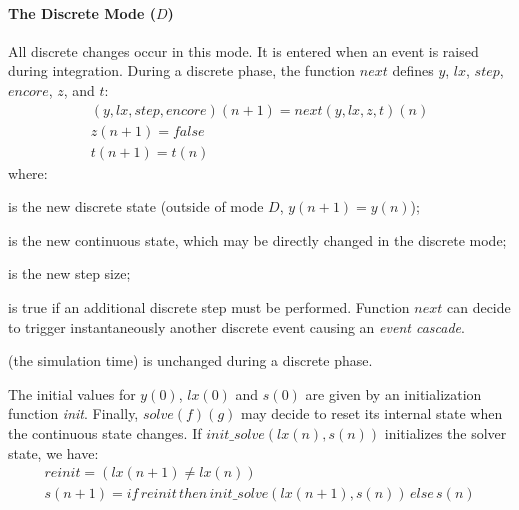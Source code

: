 \documentclass[11pt,titlepage,twoside]{report}
\newcommand{\lx}{\ensuremath{\mathit{lx}}}
\newcommand{\step}{\ensuremath{\mathit{step}}}
\newcommand{\encore}{\ensuremath{\mathit{encore}}}
\newcommand{\Solve}[2]{\mathit{solve}({#1})({#2})}
\newcommand{\Ifthenelse}[3]
   {\mathit{if}\,{#1}\,\mathit{then}\,{#2}\,\mathit{else}\,{#3}}
\newcommand{\bR}{\mathbb{R}}
\begin{document}
\paragraph{The Discrete Mode ($D$)}
All discrete changes occur in this mode.
It is entered when an
event is raised during integration. During a discrete phase,
the function $\mathit{next}$ defines $y$, $\lx$, $\step$, $\encore$, $z$, and $t$:
\[
\begin{array}{c}
(y, \lx, step, encore%
)(n+1) = next (y, \lx, z, t)(n) \\[1.5ex]
z(n+1) = false \\[1.5ex]
t(n+1) = t(n)
\end{array}
\]
where:
\begin{description}[leftmargin=6em,style=multiline]


\item[$y(n+1)$] is the new discrete state (outside of mode $D$, $y(n+1) = 
y(n)$);

\item[$\lx(n+1)$] is the new continuous state, which may be directly changed 
in the discrete mode; %

\item[$\step(n+1)$] is the new step size;

\item[$\encore(n+1)$] is true if an additional discrete step must be
  performed. Function $\mathit{next}$ can decide to trigger instantaneously
  another discrete event causing an \emph{event cascade}.

\item[$t(n)$] (the simulation time) is unchanged during a discrete phase.
\end{description}
%
The initial values for $y(0)$, $\lx(0)$ and $s(0)$ are given by an
initialization function \textit{init}. Finally, $\Solve{f}{g}$ may
decide to reset its internal state when the continuous state
changes. If $init\_solve(\lx(n), s(n))$ initializes the solver state,
we have:
\[
\begin{array}{c}
reinit = (\lx(n+1) \not= \lx(n)) \\[1.5ex]
s(n+1) = \Ifthenelse{reinit}{init\_solve(\lx(n+1), s(n))}{s(n)}
\end{array}
\]
\end{document}
